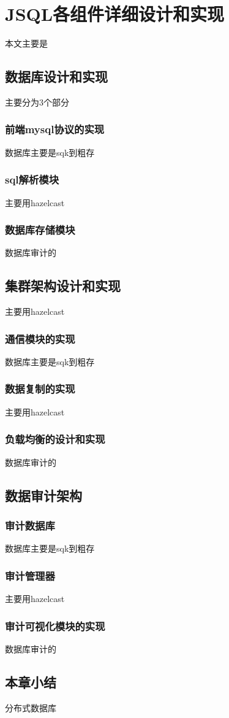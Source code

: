 
\chapter{JSQL各组件详细设计和实现}
本文主要是
\section{数据库设计和实现}
主要分为3个部分
\subsection{前端mysql协议的实现}
数据库主要是sqk到粗存
\subsection{sql解析模块}
主要用hazelcast
\subsection{数据库存储模块}
数据库审计的

\section{集群架构设计和实现}
主要用hazelcast
\subsection{通信模块的实现}
数据库主要是sqk到粗存
\subsection{数据复制的实现}
主要用hazelcast
\subsection{负载均衡的设计和实现}
数据库审计的
\section{数据审计架构}
\subsection{审计数据库}
数据库主要是sqk到粗存
\subsection{审计管理器}
主要用hazelcast
\subsection{审计可视化模块的实现}
数据库审计的
\section{本章小结}
分布式数据库



